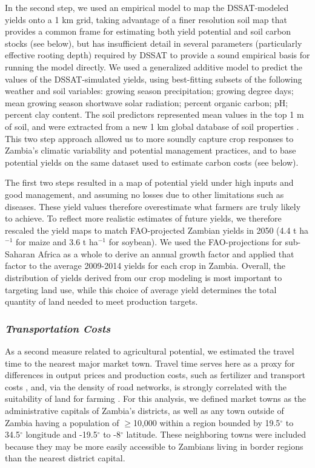 \documentclass[a4paper]{article}
\begin{document}
{In the second step, we used an empirical model to map the DSSAT-modeled yields onto a 1 km grid, taking advantage of a finer resolution soil map that provides a common frame for estimating both yield potential and soil carbon stocks (see below), but has insufficient detail in several parameters (particularly effective rooting depth) required by DSSAT to provide a sound empirical basis for running the model directly.  We used a generalized additive model \citep{wood_mgcv_2001} to predict the values of the DSSAT-simulated yields, using best-fitting subsets of the following weather and soil variables: growing season precipitation; growing degree days; mean growing season shortwave solar radiation; percent organic carbon; pH; percent clay content. The soil predictors represented mean values in the top 1 m of soil, and were extracted from a new 1 km global database of soil properties \cite{hengl_soilgrids1km_2014}.  This two step approach allowed us to more soundly capture crop responses to Zambia's climatic variability and potential management practices, and to base potential yields on the same dataset used to estimate carbon costs (see below). 

The first two steps resulted in a map of potential yield under high inputs and good management, and assuming no losses due to other limitations such as diseases. These yield values therefore overestimate what farmers are truly likely to achieve. To reflect more realistic estimates of future yields, we therefore rescaled the yield maps to match FAO-projected Zambian yields in 2050 (4.4 t ha$^{-1}$ for maize and 3.6 t ha$^{-1}$ for soybean).  We used the FAO-projections for sub-Saharan Africa as a whole to derive an annual growth factor and applied that factor to the average 2009-2014 yields for each crop in Zambia. Overall, the distribution of yields derived from our crop modeling is most important to targeting land use, while this choice of average yield determines the total quantity of land needed to meet production targets. 

\subsubsection*{\emph{Transportation Costs}}

As a second measure related to agricultural potential, we estimated the travel time to the nearest major market town. Travel time serves here as a proxy for differences in output prices and production costs, such as fertilizer and transport costs \cite{stifel_isolation_2008}, and, via the density of road networks, is strongly correlated with the suitability of land for farming \citep{laurance_estimating_2015,estes_using_2014}. For this analysis, we defined market towns as the administrative capitals of Zambia's districts, as well as any town outside of Zambia having a population of $\geq$10,000 within a region bounded by 19.5$^{\circ}$ to 34.5$^{\circ}$ longitude and -19.5$^{\circ}$ to -8$^{\circ}$ latitude. These neighboring towns were included because they may be more easily accessible to Zambians living in border regions than the nearest district capital. 

}
\end{document}

